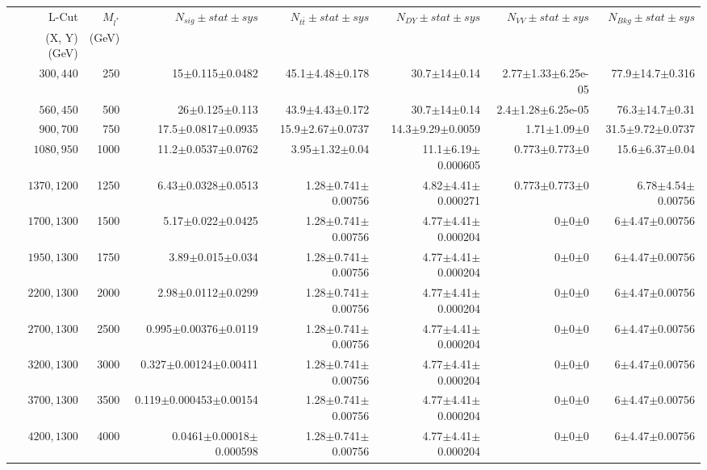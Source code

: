 \documentclass[]{article}
\begin{document}
\begin{table}
\begin{center}
\scriptsize{
\begin{tabular}{ |r|r|r|r|r|r|r|}
\hline 
L-Cut & $M_{l^*}$ & $N_{sig}\pm stat \pm sys $ &$N_{t\bar{t}}\pm stat \pm sys $ & $N_{DY}\pm stat \pm sys $ & $N_{VV}\pm stat \pm sys $ &$N_{Bkg}\pm stat \pm sys$\\
 (X, Y) (GeV) & (GeV) & && &&\\
\hline 
$300, 440$ & 250 & 15$\pm$0.115$\pm$0.0482 & 45.1$\pm$4.48$\pm$0.178 & 30.7$\pm$14$\pm$0.14 & 2.77$\pm$1.33$\pm$6.25e-05 & 77.9$\pm$14.7$\pm$0.316 \\
$560, 450$ & 500 & 26$\pm$0.125$\pm$0.113 & 43.9$\pm$4.43$\pm$0.172 & 30.7$\pm$14$\pm$0.14 & 2.4$\pm$1.28$\pm$6.25e-05 & 76.3$\pm$14.7$\pm$0.31 \\
$900, 700$ & 750 & 17.5$\pm$0.0817$\pm$0.0935 & 15.9$\pm$2.67$\pm$0.0737 & 14.3$\pm$9.29$\pm$0.0059 & 1.71$\pm$1.09$\pm$0 & 31.5$\pm$9.72$\pm$0.0737 \\
$1080,950$ & 1000 & 11.2$\pm$0.0537$\pm$0.0762 & 3.95$\pm$1.32$\pm$0.04 & 11.1$\pm$6.19$\pm$0.000605 & 0.773$\pm$0.773$\pm$0 & 15.6$\pm$6.37$\pm$0.04 \\
$1370,1200$ & 1250 & 6.43$\pm$0.0328$\pm$0.0513 & 1.28$\pm$0.741$\pm$0.00756 & 4.82$\pm$4.41$\pm$0.000271 & 0.773$\pm$0.773$\pm$0 & 6.78$\pm$4.54$\pm$0.00756 \\
$1700,1300$ & 1500 & 5.17$\pm$0.022$\pm$0.0425 & 1.28$\pm$0.741$\pm$0.00756 & 4.77$\pm$4.41$\pm$0.000204 & 0$\pm$0$\pm$0 & 6$\pm$4.47$\pm$0.00756 \\
$1950,1300$ & 1750 & 3.89$\pm$0.015$\pm$0.034 & 1.28$\pm$0.741$\pm$0.00756 & 4.77$\pm$4.41$\pm$0.000204 & 0$\pm$0$\pm$0 & 6$\pm$4.47$\pm$0.00756 \\
$2200,1300$ & 2000 & 2.98$\pm$0.0112$\pm$0.0299 & 1.28$\pm$0.741$\pm$0.00756 & 4.77$\pm$4.41$\pm$0.000204 & 0$\pm$0$\pm$0 & 6$\pm$4.47$\pm$0.00756 \\
$2700,1300$ & 2500 & 0.995$\pm$0.00376$\pm$0.0119 & 1.28$\pm$0.741$\pm$0.00756 & 4.77$\pm$4.41$\pm$0.000204 & 0$\pm$0$\pm$0 & 6$\pm$4.47$\pm$0.00756 \\
$3200,1300$ & 3000 & 0.327$\pm$0.00124$\pm$0.00411 & 1.28$\pm$0.741$\pm$0.00756 & 4.77$\pm$4.41$\pm$0.000204 & 0$\pm$0$\pm$0 & 6$\pm$4.47$\pm$0.00756 \\
$3700,1300$ & 3500 & 0.119$\pm$0.000453$\pm$0.00154 & 1.28$\pm$0.741$\pm$0.00756 & 4.77$\pm$4.41$\pm$0.000204 & 0$\pm$0$\pm$0 & 6$\pm$4.47$\pm$0.00756 \\
$4200,1300$ & 4000 & 0.0461$\pm$0.00018$\pm$0.000598 & 1.28$\pm$0.741$\pm$0.00756 & 4.77$\pm$4.41$\pm$0.000204 & 0$\pm$0$\pm$0 & 6$\pm$4.47$\pm$0.00756 \\

\end{tabular}}
\end{center}
\end{table}
\end{document}
